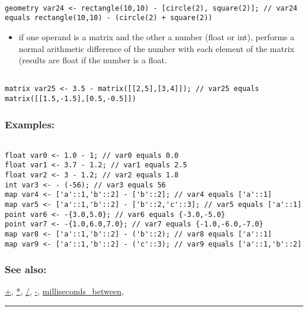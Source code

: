 \documentclass[]{book}
\providecommand{\tightlist}{%
  \setlength{\itemsep}{0pt}\setlength{\parskip}{0pt}}
\theoremstyle{definition}
\theoremstyle{definition}
\theoremstyle{definition}
\theoremstyle{remark}
\begin{document}
\begin{verbatim}
 
geometry var24 <- rectangle(10,10) - [circle(2), square(2)]; // var24 equals rectangle(10,10) - (circle(2) + square(2))
\end{verbatim}

\begin{itemize}
\tightlist
\item
  if one operand is a matrix and the other a number (float or int),
  performs a normal arithmetic difference of the number with each
  element of the matrix (results are float if the number is a float.
\end{itemize}

\begin{verbatim}
 
matrix var25 <- 3.5 - matrix([[2,5],[3,4]]); // var25 equals matrix([[1.5,-1.5],[0.5,-0.5]])
\end{verbatim}

\subsubsection{Examples:}\label{examples}

\begin{verbatim}
 
float var0 <- 1.0 - 1; // var0 equals 0.0 
float var1 <- 3.7 - 1.2; // var1 equals 2.5 
float var2 <- 3 - 1.2; // var2 equals 1.8 
int var3 <- - (-56); // var3 equals 56 
map var4 <- ['a'::1,'b'::2] - ['b'::2]; // var4 equals ['a'::1] 
map var5 <- ['a'::1,'b'::2] - ['b'::2,'c'::3]; // var5 equals ['a'::1] 
point var6 <- -{3.0,5.0}; // var6 equals {-3.0,-5.0} 
point var7 <- -{1.0,6.0,7.0}; // var7 equals {-1.0,-6.0,-7.0} 
map var8 <- ['a'::1,'b'::2] - ('b'::2); // var8 equals ['a'::1] 
map var9 <- ['a'::1,'b'::2] - ('c'::3); // var9 equals ['a'::1,'b'::2]
\end{verbatim}

\subsubsection{See also:}\label{see-also}

\href{OperatorsAA\#+}{+}, \href{OperatorsAA\#*}{*},
\href{OperatorsAA\#/}{/}, \href{OperatorsAA\#-}{-},
\href{OperatorsIM\#milliseconds_between}{milliseconds\_between},

\begin{center}\rule{0.5\linewidth}{\linethickness}\end{center}
\end{document}
